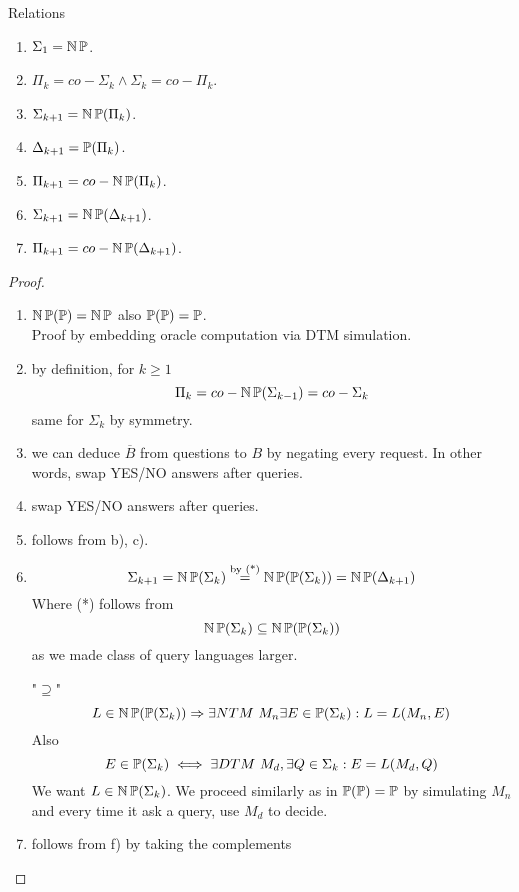 \begin{theorem} Relations
	\begin{enumerate}[label=\alph*)]
		\item $\Sigma_1 = \TNP $.
		\item $\Pi_k = co-\Sigma_k \land \Sigma_k = co-\Pi_k$.
		\item $\Sigma_{k + 1} = \TNP(\Pi_k)$.
		\item $\Delta_{k + 1} = \TP(\Pi_k)$.
		\item $\Pi_{k + 1} = co-\TNP(\Pi_k)$.
		\item $\Sigma_{k + 1} = \TNP(\Delta_{k + 1})$.
		\item $\Pi_{k + 1} = co-\TNP(\Delta_{k + 1})$.
	\end{enumerate}
\end{theorem}
\begin{proof}~
\begin{enumerate}[label=\alph*)]
	\item $\TNP(\TP) = \TNP$ also $\TP(\TP) = \TP$.\\
	Proof by embedding oracle computation via DTM simulation.

	\item by definition, for $k \geq 1$
	\[ \Pi_k = co-\TNP(\Sigma_{k - 1}) = co-\Sigma_k \]
	same for $\Sigma_k$ by symmetry.

	\item we can deduce $\overline{B}$ from questions to $B$ by negating every request.
	In other words, swap YES/NO answers after queries.

	\item swap YES/NO answers after queries.

	\item follows from b), c).

	\item
	\[ \Sigma_{k + 1} = \TNP(\Sigma_k) \stackrel{\text{by (*)}}{=} \TNP(\TP(\Sigma_k)) = \TNP(\Delta_{k + 1}) \]
	Where (*) follows from
	\[ \TNP(\Sigma_k) \subseteq \TNP(\TP(\Sigma_k)) \]
	as we made class of query languages larger.

	"$\supseteq$"\\
	\[ L \in \TNP(\TP(\Sigma_k)) \Rightarrow \exists NTM\ M_n \exists E \in \TP(\Sigma_k): L = L(M_n, E) \]
	Also
	\[ E \in \TP(\Sigma_k) \iff \exists DTM\ M_d, \exists Q \in \Sigma_k: E = L(M_d, Q) \]
	We want $L \in \TNP(\Sigma_k)$.
	We proceed similarly as in $\TP(\TP) = \TP$ by simulating $M_n$ and every time it ask a query, use $M_d$ to decide.

	\item follows from f) by taking the complements
\end{enumerate}

\end{proof}

